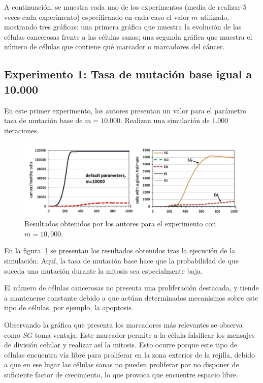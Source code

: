 A continuación, se muestra cada uno de los experimentos (media de realizar 5 veces cada experimento) especificando en cada caso
el valor $m$ utilizado, mostrando tres gráficas: una primera gráfica que muestra la
evolución de las células cancerosas frente a las células sanas; una segunda gráfica que
muestra el número de células que contiene qué marcador o marcadores del cáncer.

\subsection{Experimento 1: Tasa de mutación base igual a 10.000}

En este primer experimento, los autores presentan un valor para el parámetro
tasa de mutación base de $m=10.000$. Realizan una simulación de $1.000$ iteraciones.

\begin{figure}[h]
\centering
\includegraphics[scale=0.6]{figures/experiments/exp1}
\caption{Resultados obtenidos por los autores para el experimento con $m=10,000$.}
\label{fig:exp1}
\end{figure}

En la figura~\ref{fig:exp1} se presentan los resultados obtenidos tras la ejecución de la
simulación. Aquí, la tasa de mutación base hace que la probabilidad de que suceda una
mutación durante la mitosis sea especialmente baja.

El número de células cancerosas no presenta una proliferación destacada, y tiende a
mantenerse constante debido a que actúan determinados mecanismos sobre este tipo de células,
por ejemplo, la apoptosis.

\clearpage

Observando la gráfica que presenta los marcadores más relevantes se observa como
$SG$ toma ventaja. Este marcador permite a la célula falsificar los mensajes de
división celular y realizar así la mitosis. Esto ocurre porque este tipo de células
encuentra vía libre para proliferar en la zona exterior de la rejilla, debido a que
en ese lugar las células sanas no pueden proliferar por no disponer de suficiente
factor de crecimiento, lo que provoca que encuentre espacio libre.

